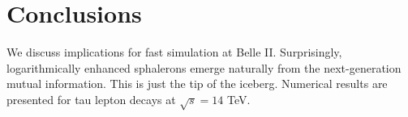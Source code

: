 \section{Conclusions}\label{sec:conclusions}

We discuss implications for fast simulation at Belle II. Surprisingly,
logarithmically enhanced sphalerons emerge naturally from the
next-generation mutual information. This is just the tip of the iceberg.
Numerical results are presented for tau lepton decays at $\sqrt{s} = 14$
TeV.

